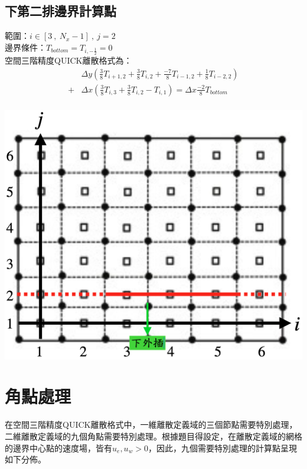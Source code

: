 \documentclass[12pt]{article}
\begin{document}
\subsection{下第二排邊界計算點}
 \begin{minipage}{0.6\textwidth}
   \noindent 範圍：$i\in[3\ ,\ N_{x}-1]\ ,\ j=2$\\[1.5ex]
   \noindent 邊界條件：$T_{bottom} = T_{i,-\frac{1}{2}}= 0$\\[1.5ex]
   \noindent 空間三階精度QUICK離散格式為：
   \begin{equation*}\label{eq:QUICK6}\begin{split}
      &\Delta y (\frac{3}{8}T_{i+1,2} + \frac{3}{8}T_{i,2} +  \frac{-7}{8}T_{i-1,2}+ \frac{1}{8}T_{i-2,2}) \\[1.5ex]
    + &\Delta x(\frac{3}{8}T_{i,3} + \frac{3}{8}T_{i,2} - T_{i,1}) =  \Delta x\frac{-2}{8}T_{bottom} \\[1.5ex]
   \end{split}\end{equation*}
   \end{minipage}%
   \hfill
   \begin{minipage}{0.34\textwidth}
   \centering
   \includegraphics[width=\linewidth,height=9\baselineskip]{19.png}
   \label{fig:6boundary}
\end{minipage}
\section{角點處理}
\noindent 在空間三階精度QUICK離散格式中，一維離散定義域的三個節點需要特別處理，二維離散定義域的九個角點需要特別處理。根據題目得設定，在離散定義域的網格的邊界中心點的速度場，皆有$u_{e},u_{w}>0$，因此，九個需要特別處理的計算點呈現如下分佈。\\
\end{document}
